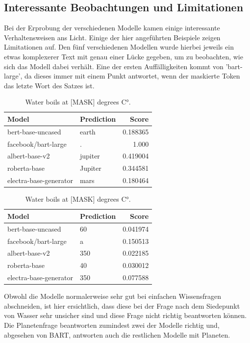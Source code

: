 \documentclass[a4paper, 11pt]{article}          %
\begin{document}
\subsection{Interessante Beobachtungen und Limitationen}
\label{sub:observations}
Bei der Erprobung der verschiedenen Modelle
kamen einige interessante Verhaltensweisen ans Licht.
Einige der hier angeführten Beispiele zeigen Limitationen auf.
Den fünf verschiedenen Modellen wurde hierbei jeweils ein etwas komplexerer Text
mit genau einer Lücke gegeben, um zu beobachten, wie sich das Modell dabei verhält.
Eine der ersten Auffälligkeiten kommt von 'bart-large', 
da dieses immer mit einem Punkt antwortet, 
wenn der maskierte Token das letzte Wort des Satzes ist.
\vspace{2em}
\begin{table}[ht]
\centering
\scriptsize
\begin{minipage}[t]{0.48\linewidth}
\centering
\caption*{The largest planet in our solar system is [MASK].}
\begin{tabular}{llr}
\toprule
Model & Prediction & Score \\
\midrule
bert-base-uncased & earth & 0.188365 \\
facebook/bart-large & . & 1.000 \\
albert-base-v2 & jupiter & 0.419004 \\
roberta-base & Jupiter & 0.344581 \\
electra-base-generator & mars & 0.180464 \\
\bottomrule
\end{tabular}
\end{minipage}
\hfill
\begin{minipage}[t]{0.48\linewidth}
\centering
\caption*{Water boils at [MASK] degrees C°.}
\begin{tabular}{llr}
\toprule
Model & Prediction & Score \\
\midrule
bert-base-uncased & 60 & 0.041974 \\
facebook/bart-large & a & 0.150513 \\
albert-base-v2 & 350 & 0.022185 \\
roberta-base & 40 & 0.030012 \\
electra-base-generator & 350 & 0.077588 \\
\bottomrule
\end{tabular}
\end{minipage}
\end{table}

Obwohl die Modelle normalerweise sehr gut bei einfachen Wissensfragen abschneiden,
ist hier ersichtlich, dass diese bei der Frage nach dem Siedepunkt von Wasser sehr unsicher sind und diese Frage nicht richtig beantworten können.
Die Planetenfrage beantworten zumindest zwei der Modelle richtig 
und, abgesehen von BART, antworten auch die restlichen Modelle mit Planeten.
\end{document}
